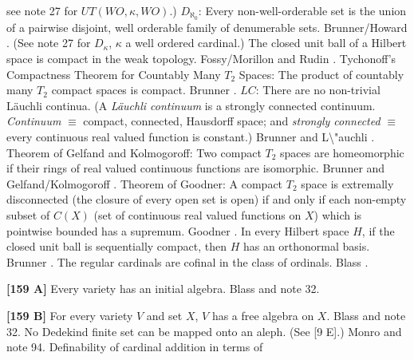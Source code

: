 see note 27 for $UT(WO,\kappa,WO)$.)
\medskip
{} $D_{\aleph_{0}}$: Every non-well-orderable set is
the union of a pairwise disjoint, well orderable family of denumerable
sets.  \ac{Brunner/Howard} \cite{1992}.  (See note 27 for $D_{\kappa}$,
$\kappa$ a well ordered cardinal.)
\medskip
{} The closed unit ball of a Hilbert space is compact
in the weak topology. \ac{Fossy/Morillon} \cite{1998} and
\ac{Rudin} \cite{1991}.
\medskip
{} Tychonoff's Compactness Theorem for Countably
Many $T_2$ Spaces: The product of countably many $T_2$ compact spaces is
compact. \ac{Brunner} \cite{1983c}. 
\medskip
{} $LC$: There are no non-trivial L\"auchli continua.
(A {\it L\"auchli continuum} is a strongly connected continuum. {\it
Continuum} $\equiv$ compact, connected, Hausdorff space; and {\it strongly
connected} $\equiv$ every continuous real valued function is constant.)
\ac{Brunner} \cite{1983a} and \ac{L\"auchli} \cite{1962}.
\medskip
{} Theorem of Gelfand and Kolmogoroff: Two compact
$T_2$ spaces are  homeomorphic if their rings of real valued continuous
functions are isomorphic. \newline \ac{Brunner} \cite{1983a} and
\ac{Gelfand/Kolmogoroff} \cite{1939}. 
\medskip
{} Theorem of Goodner: A compact $T_{2}$ space is
extremally disconnected (the closure of every open set is open) if and
only if each non-empty subset of $C(X)$ (set of continuous real valued
functions on $X$) which is pointwise bounded has a supremum. \ac{Goodner}
\cite{1950}. 
\medskip
{} In every Hilbert space $H$, if the closed unit
ball is sequentially compact, then $H$ has an orthonormal basis.
\ac{Brunner} \cite{1983b}.
\medskip
{} The regular cardinals are cofinal in the class of
ordinals.  \ac{Blass} \cite{1983b}.
\smallskip
\item{}{\bf [159 A]} Every variety has an initial algebra. \ac{Blass}
\cite{1983b} and note 32.
\smallskip
\item{}{\bf [159 B]}  For every variety $V$ and set $X$, $V$ has a free
algebra on $X$.  \ac{Blass} \cite{1983b} and note 32.
\medskip
{} No Dedekind finite set can be mapped
onto an aleph. (See [9 E].)  \ac{Monro} \cite{1975} and note 94.
\medskip
{}  Definability of cardinal addition in terms of
